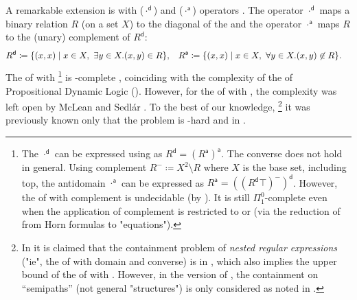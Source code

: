 \documentclass[a4paper,UKenglish,cleveref, autoref, thm-restate]{lipics-v2021}
\DeclarePairedDelimiter\set{\{}{\}}
\DeclarePairedDelimiter\tuple{(}{)}
\newcommand{\bl}{\cdot}
\newcommand{\defeq}{\coloneq}
\newcommand{\dom}{\mathsf{d}}
\begin{document}
\begin{scope}
A remarkable extension is  with \reintro*{} ($\bl^{\mathsf{d}}$) and \intro*{} ($\bl^{\mathsf{a}}$) operators \cite{desharnaisKleeneAlgebraDomain2006,desharnaisModalSemiringsRevisited2008,desharnaisInternalAxiomsDomain2011}.
The  operator $\bl^{\mathsf{d}}$ maps a binary relation $R$ (on a set $X$) to the diagonal of the 
and the  operator $\bl^{\mathsf{a}}$ maps $R$ to the (unary) complement of $R^{\mathsf{d}}$:
\begin{align*}
  R^{\mathsf{d}} &\defeq \set{ \tuple{x,x} \mid x \in X,~ \exists y \in X. \tuple{x,y} \in R}, &
  R^{\mathsf{a}} &\defeq \set{ \tuple{x,x} \mid x \in X,~ \forall y \in X. \tuple{x,y} \not\in R}.
\end{align*}
%
The  of  with %
\footnote{\label{footnote: undecidable}%
The  $\bl^{\dom}$ can be expressed using  as $R^{\mathsf{d}} = (R^{\mathsf{a}})^{\mathsf{a}}$.
The converse does not hold in general.
Using complement $R^{-} \defeq X^2 \setminus R$ where $X$ is the base set, including top,
the antidomain $\bl^{\mathsf{a}}$ can be expressed as $R^{\mathsf{a}} = ((R^{\mathsf{d}} \top)^{-})^{\mathsf{d}}$.
However, the  of  with complement is undecidable (by \cite{hardinComplexityHornTheory2003}).
It is still $\Pi^{0}_{1}$-complete even when the application of complement is restricted to  \cite[Corollary 7.2]{nakamuraUndecidabilityEmptinessProblem2025} or  \cite[Theorem 50]{nakamuraExistentialCalculiRelations2023} (via the reduction of \cite[Example 3.4]{nakamuraUndecidabilityEmptinessProblem2025} from Horn formulas to "equations").}
is -complete \cite{sedlarComplexityKleeneAlgebra2023},
coinciding with the complexity of the  of Propositional Dynamic Logic ().
However, for the  of  with , the complexity was left open by McLean \cite[Problem 7.3]{mcleanFreeKleeneAlgebras2020} and Sedl{\'a}r \cite[p.~16]{sedlarKleeneAlgebraDynamic2023}.
To the best of our knowledge,%
\footnote{In \cite[unpublished manuscript]{reutterContainmentNestedRegular2013} 
it is claimed that the containment problem of \emph{nested regular expressions} \cite{perezNSPARQLNavigationalLanguage2008} ("ie", the  of  with domain and converse) is in ,
which also implies the  upper bound of the  of  with .
However, in the version of \cite{reutterContainmentNestedRegular2013}, the containment on ``semipaths'' (not general "structures") is only considered as noted in \cite[p.~1]{reutterContainmentNestedRegular2013}.}
it was previously known only that the problem is -hard \cite{meyerEquivalenceProblemRegular1972} and in  \cite{sedlarComplexityKleeneAlgebra2023}.


\end{scope}
\end{document}
